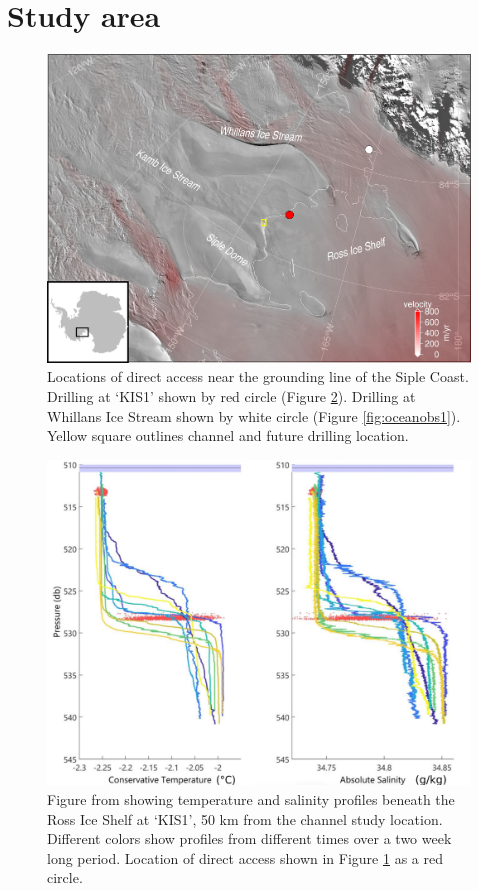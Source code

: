 \section{Study area} \label{sec:conditions}

\begin{figure}[!ht]
\centering
    \includegraphics[width=1\textwidth]{chapters/4/drilling_locations_small.png}
    \caption[Drilling locations]{Locations of direct access near the grounding line of the Siple Coast. Drilling at `KIS1' shown by red circle (Figure \ref{fig:oceanobs2}). Drilling at Whillans Ice Stream shown by white circle (Figure \ref{fig:oceanobs1}). Yellow square outlines channel and future drilling location.}
    \label{fig:map_drill}
\end{figure}

\begin{figure}[!ht]
\centering
    \includegraphics[width=1\textwidth]{chapters/4/oceanobs2.png}
    \caption[KIS1 observations]{Figure from \cite{robinson2020ice} showing temperature and salinity profiles beneath the Ross Ice Shelf at `KIS1', 50 km from the channel study location. Different colors show profiles from different times over a two week long period. Location of direct access shown in Figure \ref{fig:map_drill} as a red circle.}
    \label{fig:oceanobs2}
\end{figure}


